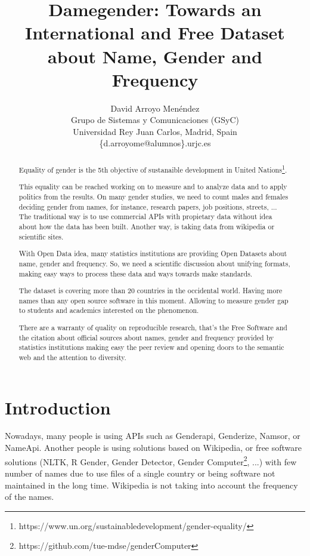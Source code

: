 \documentclass[a4paper]{article}
\title{Damegender: Towards an International and Free Dataset about Name, Gender and Frequency}
\author{
David Arroyo Menéndez \\ Grupo de Sistemas y Comunicaciones (GSyC) \\ Universidad Rey Juan Carlos, Madrid, Spain \\ \{d.arroyome@alumnos\}.urjc.es
}
\begin{document}
\maketitle

\begin{abstract}

  Equality of gender is the 5th objective of sustanaible development
  in United
  Nations\footnote{https://www.un.org/sustainabledevelopment/gender-equality/}.

  This equality can be reached working on to measure and to analyze
  data and to apply politics from the results. On many gender studies,
  we need to count males and females deciding gender from names, for
  instance, research papers, job positions, streets, ... The
  traditional way is to use commercial APIs with propietary data
  without idea about how the data has been built. Another way, is
  taking data from wikipedia or scientific sites.


  With Open Data idea, many statistics institutions are providing Open
  Datasets about name, gender and frequency. So, we need a scientific
  discussion about unifying formats, making easy ways to process these
  data and ways towards make standards.

  
  The dataset is covering more than 20 countries in the occidental
  world. Having more names than any open source software in this
  moment. Allowing to measure gender gap to students and academics
  interested on the phenomenon.


  There are a warranty of quality on reproducible research, that's the
  Free Software and the citation about official sources about names,
  gender and frequency provided by statistics institutions making easy
  the peer review and opening doors to the semantic web and the
  attention to diversity.
  
\end{abstract}



\section{Introduction}

Nowadays, many people is using APIs such as Genderapi, Genderize,
Namsor, or NameApi. Another people is using solutions based on
Wikipedia, or free software solutions (NLTK\cite{loper2002nltk}, R
Gender, Gender Detector, Gender
Computer\footnote{https://github.com/tue-mdse/genderComputer}, ...)
with few number of names due to use files of a single country or being
software not maintained in the long time. Wikipedia is not taking into
account the frequency of the names.
\end{document}
